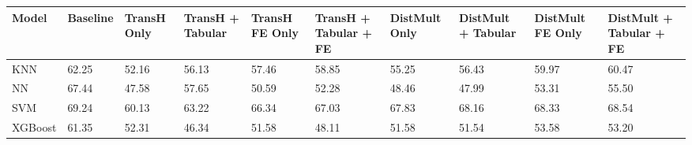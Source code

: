 \begin{tabular}{llllllllll}
\toprule
Model & Baseline & TransH Only & TransH + Tabular & TransH FE Only & TransH + Tabular + FE & DistMult Only & DistMult + Tabular & DistMult FE Only & DistMult + Tabular + FE \\
\midrule
KNN & 62.25 & 52.16 & 56.13 & 57.46 & 58.85 & 55.25 & 56.43 & 59.97 & 60.47 \\
NN & 67.44 & 47.58 & 57.65 & 50.59 & 52.28 & 48.46 & 47.99 & 53.31 & 55.50 \\
SVM & 69.24 & 60.13 & 63.22 & 66.34 & 67.03 & 67.83 & 68.16 & 68.33 & 68.54 \\
XGBoost & 61.35 & 52.31 & 46.34 & 51.58 & 48.11 & 51.58 & 51.54 & 53.58 & 53.20 \\
\bottomrule
\end{tabular}
